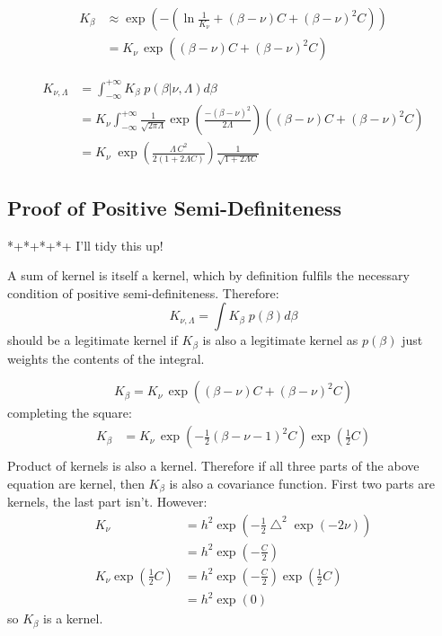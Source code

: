 \documentclass{article}
\begin{document}
\begin{align}
K_\beta &\approx \exp \left(-\left( \ln \frac{1}{K_{\nu}} + (\beta-\nu) C + (\beta-\nu)^2 C \right)   \right)\\
&= K_{\nu} \, \exp \left( (\beta-\nu) C + (\beta-\nu)^2 C \right)
\end{align}

\begin{align}
K_{\nu,\Lambda} &= \int_{-\infty}^{+\infty} K_\beta \; p(\beta|\nu,\Lambda) d\beta \\
&= K_{\nu}\int_{-\infty}^{+\infty} \frac{1}{\sqrt{2 \pi \Lambda}} \exp \left( \frac{ -(\beta - \nu)^2}{2\Lambda} \right) \left( (\beta-\nu) C + (\beta-\nu)^2 C \right) \\
&= K_{\nu} \; \exp \left( \frac{\Lambda\, C^2}{2(1+2\Lambda C)} \right) \frac{1}{\sqrt{1+ 2\Lambda C}}
\end{align}








\subsection{Proof of Positive Semi-Definiteness}

*+*+*+*+ I'll tidy this up!

A sum of kernel is itself a kernel, which by definition fulfils the necessary condition of positive semi-definiteness. Therefore:
\begin{equation}
K_{\nu,\Lambda} = \int K_\beta \;p(\beta)d\beta
\end{equation}
should be a legitimate kernel if $K_\beta$ is also a legitimate kernel as $p(\beta)$ just weights the contents of the integral.

\begin{equation}
K_\beta = K_{\nu} \, \exp \left( (\beta-\nu) C + (\beta-\nu)^2 C \right)
\end{equation}
completing the square:
\begin{align}
K_\beta &= K_{\nu} \,  \exp \left(  -\frac{1}{2} (\beta - \nu - 1) ^ 2C   \right) \exp \left( \frac{1}{2}C \right) \\
\end{align}
Product of kernels is also a kernel. Therefore if all three parts of the above equation are kernel, then $K_\beta$ is also a covariance function. First two parts are kernels, the last part isn't. However:
\begin{align}
K_{\nu} &= h^2 \exp\left( -\frac{1}{2}\bigtriangleup^2 \exp(-2\nu) \right)\\
&= h^2 \exp\left( -\frac{C}{2} \right)\\
K_{\nu} \exp \left( \frac{1}{2}C \right) &= h^2 \exp\left( -\frac{C}{2} \right) \exp \left( \frac{1}{2}C \right) \\
&= h^2 \exp\left( 0 \right)
\end{align}
so $K_\beta$ is a kernel.
\end{document}
